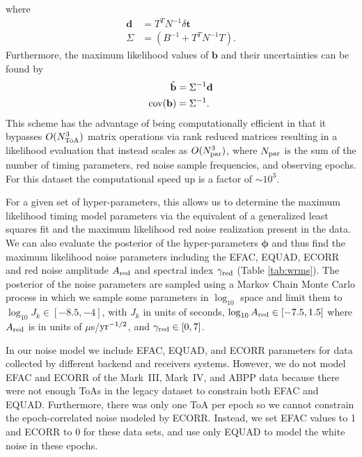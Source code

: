 \ee
where
\begin{align}
\mathbf{d} &= T^{T}N^{-1}\delta\mathbf{t} \\
\Sigma &= (B^{-1} + T^{T}N^{-1}T).
\end{align}
Furthermore, the maximum likelihood values of $\mathbf{b}$ and their uncertainties can be found by
\begin{align}
\hat{\mathbf{b}} &= \Sigma^{-1}\mathbf{d} \\
{\rm cov}(\mathbf{b}) &= \Sigma^{-1}.
\end{align}
This scheme has the advantage of being computationally efficient in that it
bypasses $O(N_{\rm ToA}^{3})$ matrix operations via rank reduced matrices
\citep{vv14} resulting in a likelihood evaluation that instead scales as
$O(N_{\rm par}^{3})$, where $N_{\rm par}$ is the sum of the number of timing
parameters, red noise sample frequencies, and observing epochs. For this
dataset the computational speed up is a factor of $\sim 10^{3}$.


For a given set of hyper-parameters, this allows us to determine the maximum likelihood timing model parameters via the equivalent of a generalized least squares fit 
and the maximum likelihood red noise realization present in the data. 
We can also evaluate the posterior of the hyper-parameters $\boldsymbol{\phi}$
and thus find the maximum likelihood noise parameters including the EFAC, EQUAD,
ECORR and red noise amplitude $A_{\rm red}$ and spectral index $\gamma_{\rm
red}$ (Table \ref{tab:wrms}).
The posterior of the noise parameters are sampled using a Markov Chain Monte
Carlo process in which we sample some parameters in $\log_{10}$ space and limit them to $\log_{10}J_{k}\in[-8.5, -4]$, with $J_{k}$ in units of seconds, $\log_{10}A_{\rm red}\in[-7.5,1.5]$ where $A_{\rm red}$ is in units of $\mu$s/${\rm yr}^{-1/2}$, and $\gamma_{\rm red}\in[0,7]$. 

In our noise model we include EFAC, EQUAD, and ECORR parameters
for data collected by different backend and receivers systems. However, we do not model 
EFAC and ECORR of the Mark~III, Mark~IV, and ABPP data because there were not
enough ToAs in the legacy dataset to constrain both EFAC and EQUAD. Furthermore,
there was only one ToA per epoch so we cannot constrain the epoch-correlated
noise modeled by ECORR. Instead, we set EFAC values to 1
and ECORR to 0 for these data sets, and use only EQUAD to model the white noise in these epochs.


